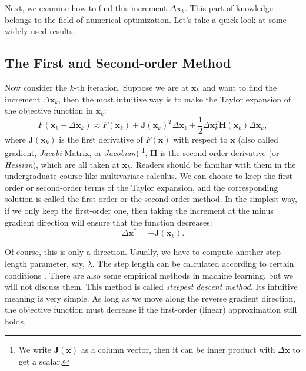 Next, we examine how to find this increment $\Delta \mathbf{x}_k$. This part of knowledge belongs to the field of numerical optimization. Let's take a quick look at some widely used results.

\subsection{The First and Second-order Method}
Now consider the $k$-th iteration. Suppose we are at $\mathbf{x}_k$ and want to find the increment $\Delta \mathbf{x}_k$, then the most intuitive way is to make the Taylor expansion of the objective function in $\mathbf{x}_k$:
\begin{equation}
    F(\mathbf{x}_k+\Delta \mathbf{x}_k) \approx F{\left( \mathbf{x}_k \right)} + \mathbf{J} \left( \mathbf{x}_k \right) ^T \Delta \mathbf{x}_k + \frac{1}{2}\Delta {\mathbf{x}_k^T}\mathbf{H}(\mathbf{ x}_k) \Delta \mathbf{x}_k,
\end{equation}
where $\mathbf{J}(\mathbf{x}_k)$ is the first derivative of $F(\mathbf{x})$ with respect to $\mathbf{x}$ (also called gradient, \textit{Jacobi} Matrix, or \textit{Jacobian}) \footnote{We write $\mathbf{J}(\mathbf{x})$ as a column vector, then it can be inner product with $\Delta \mathbf{x}$ to get a scalar. }, $\mathbf{H}$ is the second-order derivative (or \textit{Hessian}), which are all taken at $\mathbf{x}_k$. Readers should be familiar with them in the undergraduate course like multivariate calculus. We can choose to keep the first-order or second-order terms of the Taylor expansion, and the corresponding solution is called the first-order or the second-order method. In the simplest way, if we only keep the first-order one, then taking the increment at the minus gradient direction will ensure that the function decreases: 
\begin{equation}
    \Delta \mathbf{x}^* =-\mathbf{J}(\mathbf{x}_k).
\end{equation}

Of course, this is only a direction. Usually, we have to compute another step length parameter, say, $\lambda$. The step length can be calculated according to certain conditions {\cite{Wolfe1969}}. There are also some empirical methods in machine learning, but we will not discuss them. This method is called \textit{steepest descent method}. Its intuitive meaning is very simple. As long as we move along the reverse gradient direction, the objective function must decrease if the first-order (linear) approximation still holds.

